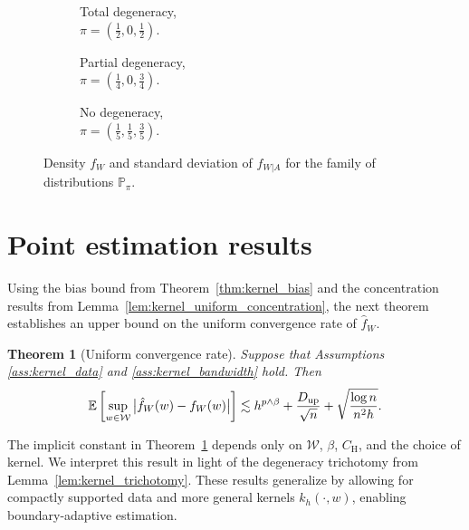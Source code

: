 \documentclass[11pt,lof]{puthesis}
\renewcommand{\P}{\ensuremath{\mathbb{P}}}
\newcommand{\E}{\ensuremath{\mathbb{E}}}
\newcommand{\rH}{\ensuremath{\mathrm{H}}}
\newcommand{\cW}{\ensuremath{\mathcal{W}}}
\newcommand{\Du}{\ensuremath{D_{\textup{up}}}}
\theoremstyle{break}
\newtheorem{theorem}{Theorem}[section]
\theoremstyle{proof}
\begin{document}
\begin{figure}[t]
\centering
%
\begin{subfigure}{0.32\textwidth}
\centering
\caption{Total degeneracy, \\
$\pi = \left( \frac{1}{2}, 0, \frac{1}{2} \right)$.}
\end{subfigure}
%
\begin{subfigure}{0.32\textwidth}
\centering
\caption{Partial degeneracy, \\
$\pi = \left( \frac{1}{4}, 0, \frac{3}{4} \right)$.}
\end{subfigure}
%
\begin{subfigure}{0.32\textwidth}
\centering
\caption{No degeneracy, \\
$\pi = \left( \frac{1}{5}, \frac{1}{5}, \frac{3}{5} \right)$.}
\end{subfigure}
%
\caption[The family of distributions $\P_\pi$]{
Density $f_W$ and standard deviation
of $f_{W|A}$ for the family of distributions $\P_\pi$.}
%
\label{fig:kernel_distribution}
\end{figure}

\section{Point estimation results}
\label{sec:kernel_point_estimation}

Using the bias bound from Theorem~\ref{thm:kernel_bias} and
the concentration results from Lemma~\ref{lem:kernel_uniform_concentration},
the next theorem establishes an upper bound on the uniform convergence rate of
$\hat f_W$.
%
\begin{theorem}[Uniform convergence rate]%
\label{thm:kernel_uniform_consistency}%
Suppose that Assumptions \ref{ass:kernel_data} and
\ref{ass:kernel_bandwidth} hold. Then
%
\begin{align*}
\E\left[
\sup_{w \in \cW}
\big|\hat{f}_W(w) - f_W(w)\big|
\right]
\lesssim
h^{p\wedge\beta} + \frac{\Du}{\sqrt n} + \sqrt{\frac{\log n}{n^2h}}.
\end{align*}
\end{theorem}
%
The implicit constant in Theorem~\ref{thm:kernel_uniform_consistency} depends
only on
$\cW$, $\beta$, $C_\rH$, and the choice of kernel. We interpret this result in
light of the degeneracy trichotomy from Lemma~\ref{lem:kernel_trichotomy}.
These results generalize \citet*[Theorem~1]{chiang2020empirical}
by allowing for compactly supported data and more general kernels
$k_h(\cdot,w)$, enabling boundary-adaptive estimation.
\end{document}
